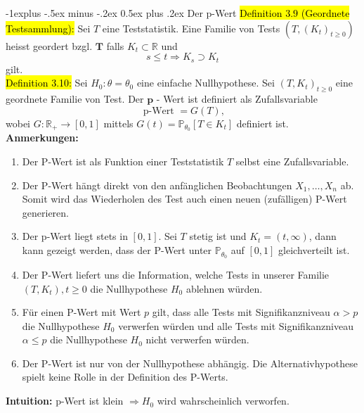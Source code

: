 \documentclass[10pt,landscape]{article}
\makeatletter
\newcommand{\blue}[1]{\sethlcolor{cyan} \hl{#1}}
\renewcommand{\subsection}{\@startsection{subsection}{1}{0mm}%
                                {-1ex plus -.5ex minus -.2ex}%
                                {0.5ex plus .2ex}%
                                {\normalfont\large\bfseries}}
\renewcommand{\subsection}{\@startsection{subsection}{2}{0mm}%
                                {-1explus -.5ex minus -.2ex}%
                                {0.5ex plus .2ex}%
                                {\normalfont\normalsize\bfseries}}
\makeatother
\begin{document}
\begin{multicols}{3}
\subsection{Der p-Wert}
\blue{Definition $3.9$ (Geordnete Testsammlung):} Sei $T$ eine Teststatistik. Eine Familie von Tests $\left(T,\left(K_{t}\right)_{t \geq 0}\right)$ heisst geordert bzgl. $\boldsymbol{T}$ falls $K_{t} \subset \mathbb{R}$ und
$$
s \leq t \Longrightarrow K_{s} \supset K_{t}
$$
gilt. \\
\blue{Definition 3.10:} Sei $H_{0}: \theta=\theta_{0}$ eine einfache Nullhypothese. Sei $\left(T, K_{t}\right)_{t \geq 0}$ eine geordnete Familie von Test. Der $\boldsymbol{p}$ - Wert ist definiert als Zufallsvariable
$$
\text { p-Wert }=G(T),
$$
wobei $G: \mathbb{R}_{+} \rightarrow[0,1]$ mittels $G(t)=\mathbb{P}_{\theta_{0}}\left[T \in K_{t}\right]$ definiert ist. \\
\textbf{Anmerkungen:}
\begin{enumerate}
    \item Der P-Wert ist als Funktion einer Teststatistik $T$ selbst eine Zufallsvariable.
    \item Der P-Wert hängt direkt von den anfänglichen Beobachtungen $X_{1}, \ldots, X_{n}$ ab. Somit wird das Wiederholen des Test auch einen neuen (zufälligen) P-Wert generieren.
    \item Der p-Wert liegt stets in $[0,1]$. Sei $T$ stetig ist und $K_{t}=(t, \infty)$, dann kann gezeigt werden, dass der $\mathrm{P}$-Wert unter $\mathbb{P}_{\theta_{0}}$ auf $[0,1]$ gleichverteilt ist.
    \item Der P-Wert liefert uns die Information, welche Tests in unserer Familie $\left(T, K_{t}\right), t \geq 0$ die Nullhypothese $H_{0}$ ablehnen würden.
    \item Für einen P-Wert mit Wert $p$ gilt, dass alle Tests mit Signifikanzniveau $\alpha>p$ die Nullhypothese $H_{0}$ verwerfen würden und alle Tests mit Signifikanzniveau $\alpha \leq p$ die Nullhypothese $H_{0}$ nicht verwerfen würden.
    \item Der P-Wert ist nur von der Nullhypothese abhängig. Die Alternativhypothese spielt keine Rolle in der Definition des P-Werts.
\end{enumerate}
\textbf{Intuition:} $\mathrm{p}$-Wert ist klein $\Longrightarrow H_{0}$ wird wahrscheinlich verworfen.\\

\end{multicols}
\end{document}
